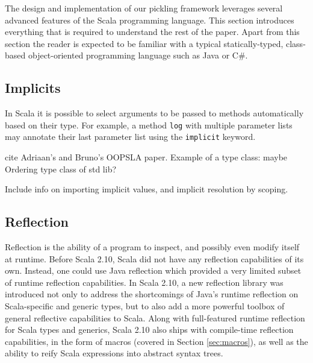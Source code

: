 \documentclass[preprint,10pt]{sigplanconf}
\theoremstyle{definition}
\begin{document}
The design and implementation of our pickling framework leverages
several advanced features of the Scala programming language. This
section introduces everything that is required to understand the rest
of the paper. Apart from this section the reader is expected to be
familiar with a typical statically-typed, class-based object-oriented
programming language such as Java or C\#.

\subsection{Implicits}
\label{sec:implicits}

In Scala it is possible to select arguments to be passed to methods
automatically based on their type. For example, a method \verb|log| with
multiple parameter lists may annotate their last parameter list using the
\verb|implicit| keyword.


cite Adriaan's and Bruno's OOPSLA paper.
Example of a type class: maybe Ordering type class of std lib?

Include info on importing implicit values, and implicit resolution by scoping.

\subsection{Reflection}

Reflection is the ability of a program to inspect, and possibly even modify
itself at runtime. Before Scala 2.10, Scala did not have any reflection
capabilities of its own. Instead, one could use Java reflection which provided
a very limited subset of runtime reflection capabilities. In Scala 2.10, a new
reflection library was introduced not only to address the shortcomings of
Java's runtime reflection on Scala-specific and generic types, but to also add
a more powerful toolbox of general reflective capabilities to Scala. Along
with full-featured runtime reflection for Scala types and generics, Scala 2.10
also ships with compile-time reflection capabilities, in the form of macros
(covered in Section \ref{sec:macros}), as well as the ability to reify Scala
expressions into abstract syntax trees.
\end{document}
